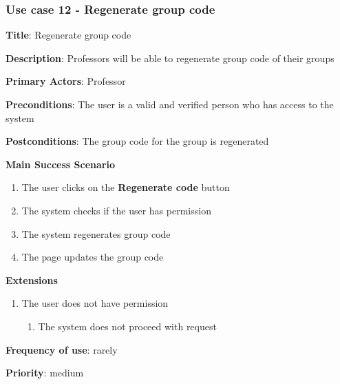 \documentclass[singlespacing,12pt,parskip,headsepline,consistentlayout]{article}
\begin{document}
\subsubsection{Use case 12 - Regenerate group code}
\begin{flushleft}
\vspace{0.2cm}
\hline
\vspace{0.2cm}
{\bfseries Title}: {Regenerate group code}

{\bfseries Description}: {Professors will be able to regenerate group code of their groups}

{\bfseries Primary Actors}: {Professor}

{\bfseries Preconditions}: The user is a valid and verified person who has access to the system

{\bfseries Postconditions}: {The group code for the group is regenerated}

{\bfseries Main Success Scenario}

\begin{enumerate}
      \item The user clicks on the {\bfseries Regenerate code} button
      \item The system checks if the user has permission
      \item The system regenerates group code
      \item The page updates the group code
\end{enumerate}
 
{\bfseries Extensions}

\begin{enumerate}
  \item The user does not have permission
  \begin{enumerate}
      \item The system does not proceed with request
  \end{enumerate}
\end{enumerate}

{\bfseries Frequency of use}: rarely

{\bfseries Priority}: medium

\end{flushleft}

\pagebreak
\end{document}
